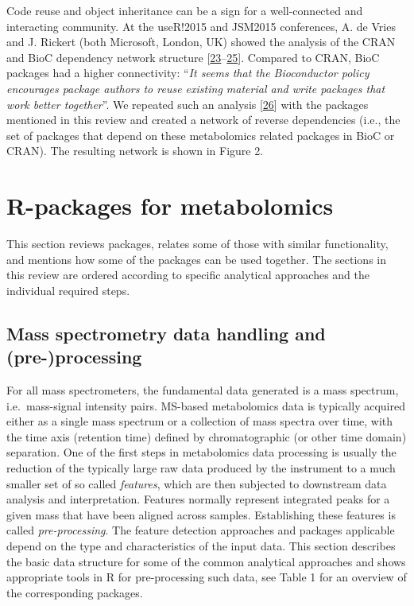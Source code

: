 \documentclass[]{article}
\begin{document}
Code reuse and object inheritance can be a sign for a well-connected and interacting community. At the useR!2015 and JSM2015 conferences, A. de Vries and J. Rickert (both Microsoft, London, UK) showed the analysis of the CRAN and BioC dependency network structure {[}\protect\hyperlink{ref-devries_website_2015b}{23}--\protect\hyperlink{ref-devries_website_2015}{25}{]}. Compared to CRAN, BioC packages had a higher connectivity: ``\emph{It seems that the Bioconductor policy encourages package authors to reuse existing material and write packages that work better together}''. We repeated such an analysis {[}\protect\hyperlink{ref-neumann_website_2019}{26}{]} with the packages mentioned in this review and created a network of reverse dependencies (i.e., the set of packages that depend on these metabolomics related packages in BioC or CRAN). The resulting network is shown in Figure 2.

\newpage

\hypertarget{r-packages-for-metabolomics}{%
\section{R-packages for metabolomics}\label{r-packages-for-metabolomics}}

This section reviews packages, relates some of those with similar functionality, and mentions how some of the packages can be used together. The sections in this review are ordered according to specific analytical approaches and the individual required steps.

\newpage

\hypertarget{mass-spectrometry-data-handling-and-pre-processing}{%
\subsection{Mass spectrometry data handling and (pre-)processing}\label{mass-spectrometry-data-handling-and-pre-processing}}

For all mass spectrometers, the fundamental data generated is a mass spectrum, i.e.~mass-signal intensity pairs. MS-based metabolomics data is typically acquired either as a single mass spectrum or a collection of mass spectra over time, with the time axis (retention time) defined by chromatographic (or other time domain) separation. One of the first steps in metabolomics data processing is usually the reduction of the typically large raw data produced by the instrument to a much smaller set of so called \emph{features}, which are then subjected to downstream data analysis and interpretation. Features normally represent integrated peaks for a given mass that have been aligned across samples. Establishing these features is called \emph{pre-processing}. The feature detection approaches and packages applicable depend on the type and characteristics of the input data. This section describes the basic data structure for some of the common analytical approaches and shows appropriate tools in R for pre-processing such data, see Table 1 for an overview of the corresponding packages.
\end{document}
